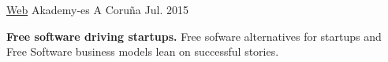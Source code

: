 \begin{cventries}

\cventry
{\href{https://www.kde-espana.org/akademy-es2015/index.php}{Web}} %
{Akademy-es} %
{A Coruña} %
{Jul. 2015} %
{ %
\begin{cvitems}
\item {\textbf{Free software driving startups.} Free sofware alternatives for 
startups and Free Software business models lean on successful stories.}
\end{cvitems}
}


\end{cventries}